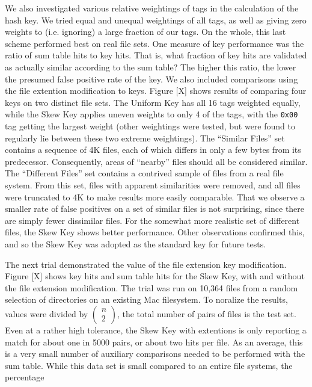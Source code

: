 \documentclass[10pt, twocolumn]{article}
\begin{document}
We also investigated various relative weightings of tags in the calculation of the hash key.  We tried equal and unequal weightings of all tags, as well as giving zero weights to (i.e. ignoring) a large fraction of our tags.  On the whole, this last scheme performed best on real file sets. One measure of key performance was the ratio of  sum table hits to key hits.  That is, what fraction of key hits are validated as actually similar according to the sum table?  The higher this ratio, the lower the presumed false positive rate of the key.  We also included comparisons using the file extention modification to keys.  Figure [X] shows results of comparing four keys on two distinct file sets.  The Uniform Key has all 16 tags weighted equally, while the Skew Key applies uneven weights to only 4 of the tags, with the {\tt 0x00} tag getting the largest weight (other weightings were tested, but were found to regularly lie between these two extreme weightings).  The ``Similar Files'' set contains a sequence of 4K files, each of which differs in only a few bytes from its predecessor.  Consequently, areas of ``nearby'' files should all be considered similar.  The ``Different Files'' set contains a contrived sample of files from a real file system.  From this set, files with apparent similarities were removed, and all files were truncated to 4K to make results more easily comparable.  That we observe a smaller rate of false positives on a set of similar files is not surprising, since there are simply fewer dissimilar files.  For the somewhat more realistic set of different files, the Skew Key shows better performance.  Other observations confirmed this, and so the Skew Key was adopted as the standard key for future tests.

The next trial demonstrated the value of the file extension key modification.  Figure [X]  shows key hits and sum table hits for the Skew Key, with and without the file extension modification.  The trial was run on 10,364 files from a random selection of directories on an existing Mac filesystem.  To noralize the results, values were divided by $\left( \begin{array}{c} n \\ 2 \end{array} \right)$, the total number of pairs of files is the test set.  Even at a rather high tolerance, the Skew Key with extentions is only reporting a match for about one in 5000 pairs, or about two hits per file.  As an average, this is a very small number of auxiliary comparisons needed to be performed with the sum table.  While this data set is small compared to an entire file systems, the percentage 
\end{document}
